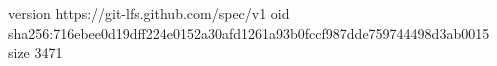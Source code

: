 version https://git-lfs.github.com/spec/v1
oid sha256:716ebee0d19dff224e0152a30afd1261a93b0fccf987dde759744498d3ab0015
size 3471
